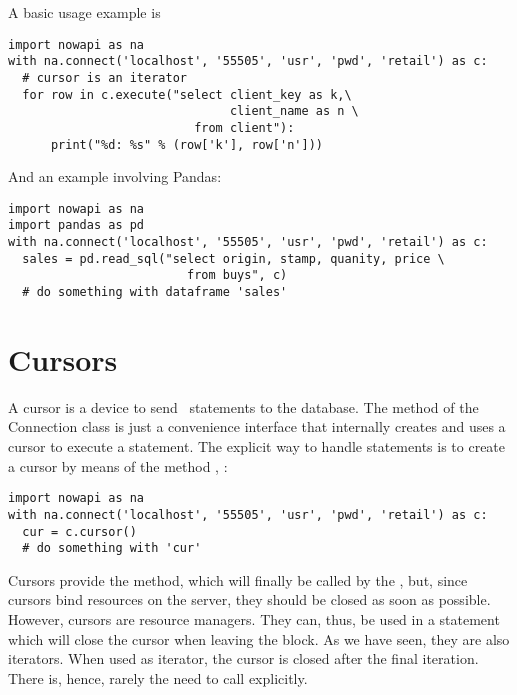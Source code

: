 A basic usage example is

\begin{python}
\begin{lstlisting}
import nowapi as na
with na.connect('localhost', '55505', 'usr', 'pwd', 'retail') as c:
  # cursor is an iterator
  for row in c.execute("select client_key as k,\
                               client_name as n \
                          from client"):
      print("%d: %s" % (row['k'], row['n']))
\end{lstlisting}
\end{python}

And an example involving Pandas:

\begin{python}
\begin{lstlisting}
import nowapi as na
import pandas as pd
with na.connect('localhost', '55505', 'usr', 'pwd', 'retail') as c:
  sales = pd.read_sql("select origin, stamp, quanity, price \
                         from buys", c)
  # do something with dataframe 'sales'
\end{lstlisting}
\end{python}

\section{Cursors}
A cursor is a device to send \sql\ statements to the database.
The  method of the Connection class is just a
convenience interface that internally creates and uses a
cursor to execute a statement. The explicit way to handle statements
is to create a cursor by means of the method \term{cursor}, \eg:

\begin{python}
\begin{lstlisting}
import nowapi as na
with na.connect('localhost', '55505', 'usr', 'pwd', 'retail') as c:
  cur = c.cursor()
  # do something with 'cur'
\end{lstlisting}
\end{python}

Cursors provide the  method, which
will finally be called by the ,
but, since cursors bind resources on the server,
they should be closed
as soon as possible.
However, cursors are resource managers.
They can, thus, be used in a  statement
which will close the cursor when leaving the block.
As we have seen, they are also iterators.
When used as iterator, the cursor is closed
after the final iteration.
There is, hence, rarely the need to call 
explicitly.

